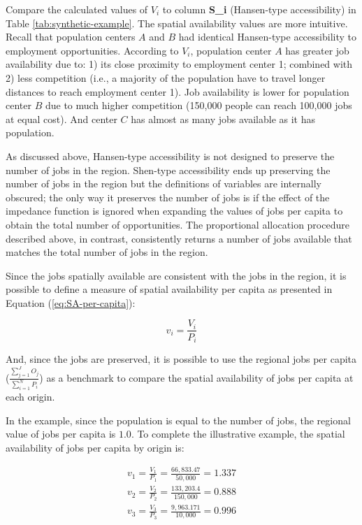\documentclass[]{elsarticle} %
\begin{document}
Compare the calculated values of \(V_i\) to column \textbf{S\_i}
(Hansen-type accessibility) in Table \ref{tab:synthetic-example}. The
spatial availability values are more intuitive. Recall that population
centers \(A\) and \(B\) had identical Hansen-type accessibility to
employment opportunities. According to \(V_i\), population center \(A\)
has greater job availability due to: 1) its close proximity to
employment center 1; combined with 2) less competition (i.e., a majority
of the population have to travel longer distances to reach employment
center 1). Job availability is lower for population center \(B\) due to
much higher competition (150,000 people can reach 100,000 jobs at equal
cost). And center \(C\) has almost as many jobs available as it has
population.

As discussed above, Hansen-type accessibility is not designed to
preserve the number of jobs in the region. Shen-type accessibility ends
up preserving the number of jobs in the region but the definitions of
variables are internally obscured; the only way it preserves the number
of jobs is if the effect of the impedance function is ignored when
expanding the values of jobs per capita to obtain the total number of
opportunities. The proportional allocation procedure described above, in
contrast, consistently returns a number of jobs available that matches
the total number of jobs in the region.

Since the jobs spatially available are consistent with the jobs in the
region, it is possible to define a measure of spatial availability per
capita as presented in Equation (\ref{eq:SA-per-capita}):

\begin{equation}
\label{eq:SA-per-capita}
v_i = \frac{V_i}{P_i}
\end{equation}

And, since the jobs are preserved, it is possible to use the regional
jobs per capita (\(\frac{\sum_{j=1}^J O_j}{\sum_{i=1}^N P_i}\)) as a
benchmark to compare the spatial availability of jobs per capita at each
origin.

In the example, since the population is equal to the number of jobs, the
regional value of jobs per capita is \(1.0\). To complete the
illustrative example, the spatial availability of jobs per capita by
origin is:

\begin{equation}
\label{eq:SA-per-capita-2populations}
\begin{array}{l}
v_{1} = \frac{V_1}{P_1} =  \frac{66,833.47}{50,000} = 1.337\\
v_{2} =  \frac{V_{2}}{P_2} =  \frac{133,203.4}{150,000} = 0.888\\
v_{3} =  \frac{V_{3}}{P_3} =  \frac{9,963.171}{10,000} = 0.996\\
\end{array}
\end{equation}
\end{document}
